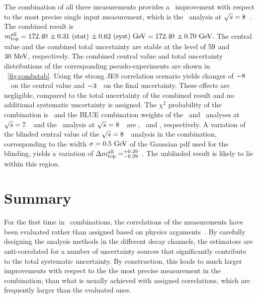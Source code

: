 The combination of all three measurements provides a \CombImprovement\ improvement with respect to the most precise single input measurement, which is the \ttbarll\ analysis at ${\sqrt{s}}=8$~\TeV. The combined result is $m_{\mathrm{top}}^{\mathrm{all}} = 172.40\,\pm 0.31~\mathrm{(stat)}\,\pm 0.62~\mathrm{(syst)}~\mathrm{GeV} = 172.40\,\pm 0.70~\mathrm{GeV}$. The central value and the combined total uncertainty are stable at the level of $59$ and $30~\mathrm{MeV}$, respectively. The combined central value and total uncertainty distributions of the corresponding pseudo-experiments are shown in \fig~\ref{fig:combstab}. Using the strong \gls{JES} correlation scenario yields changes of $-8$~\MeV\ on the central value and $-3$~\MeV\ on the final uncertainty. These effects are negligible, compared to the total uncertainty of the combined result and no additional systematic uncertainty is assigned. 
%
The $\chi^2$ probability of the combination is \CombChiSqProb\ and the \gls{BLUE} combination weights of the \ljets\ and \dil\ analyses at ${\sqrt{s}}=7$~\TeV\ and the \dil\ analysis at ${\sqrt{s}}=8$~\TeV\ are \CombWeightLLseven, \CombWeightDLseven\ and \CombWeightDLeight, respectively.
%
A variation of the blinded central value of the ${\sqrt{s}}=8$~\TeV\ analysis in the combination, corresponding to the width $\sigma=0.5~\mathrm{GeV}$ of the Gaussian \gls{pdf} used for the blinding, yields a variation of $\Delta m_{\mathrm{top}}^{\mathrm{all}}=^{+0.29}_{-0.29}$~\GeV. The unblinded result is likely to lie within this region.








\section{Summary}
%
%
For the first time in \mt\ combinations, the correlations of the measurements have been evaluated rather than assigned based on physics arguments~\cite{Aad:2015nba}. By carefully designing the analysis methods in the different decay channels, the estimators are anti-correlated for a number of uncertainty sources that significantly contribute to the total systematic uncertainty. By construction, this leads to much larger improvements with respect to the the most precise measurement in the combination, than what is usually achieved with assigned correlations, which are frequently larger than the evaluated ones.



